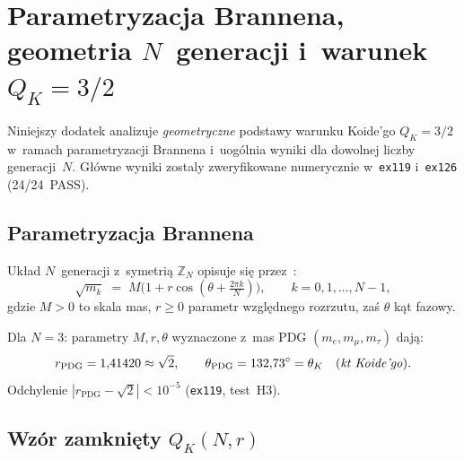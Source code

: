 \section{Parametryzacja Brannena, geometria $N$~genera\-cji i~warunek
  $Q_K = 3/2$}%
\label{app:T3-brannen}

Niniejszy dodatek analizuje \emph{geometryczne} podstawy warunku
Koide'go $Q_K = 3/2$ w~ramach parametryzacji Brannena i~uog\'olnia
wyniki dla dowolnej liczby generacji~$N$.
G\l{}\'owne wyniki zostaly zweryfikowane numerycznie w~\texttt{ex119}
i~\texttt{ex126} (24/24~PASS).

\subsection{Parametryzacja Brannena}\label{app:T3-brannen-param}

\begin{definition}\label{def:T3-brannen}
Uk\l{}ad $N$~generacji z~symetri\k{a} $\mathbb{Z}_N$ opisuje si\k{e}
przez~\cite{Brannen2006}:
\begin{equation}\label{eq:T3-brannen}
  \sqrt{m_k} \;=\; M\bigl(1 + r\cos(\theta + \tfrac{2\pi k}{N})\bigr),
  \qquad k = 0, 1, \ldots, N-1,
\end{equation}
gdzie $M > 0$ to skala mas, $r \geq 0$ parametr wzgl\k{e}dnego
rozrzutu, za\'s $\theta$ k\k{a}t fazowy.
\end{definition}

\begin{remark}
Dla $N = 3$: parametry $M, r, \theta$ wyznaczone z~mas PDG
$(m_e, m_\mu, m_\tau)$ daj\k{a}:
\[
  r_{\mathrm{PDG}} = 1{,}41420 \approx \sqrt{2},
  \qquad
  \theta_{\mathrm{PDG}} = 132{,}73^\circ = \theta_K
  \quad\text{(\emph{k\k{a}t Koide'go})}.
\]
Odchylenie $|r_{\mathrm{PDG}} - \sqrt{2}| < 10^{-5}$
(\texttt{ex119}, test~H3).
\end{remark}

\subsection{Wz\'or zamkni\k{e}ty $Q_K(N, r)$}\label{app:T3-qk-formula}

